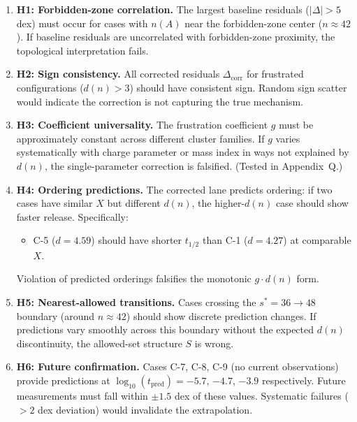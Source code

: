 \begin{edcopenbox}[title=Falsifiability Hooks]
\begin{enumerate}
    \item \textbf{H1: Forbidden-zone correlation.}
          The largest baseline residuals ($|\Delta| > 5$ dex) must occur
          for cases with $n(A)$ near the forbidden-zone center ($n \approx 42$).
          If baseline residuals are uncorrelated with forbidden-zone proximity,
          the topological interpretation fails.

    \item \textbf{H2: Sign consistency.}
          All corrected residuals $\Delta_{\text{corr}}$ for frustrated
          configurations ($d(n) > 3$) should have consistent sign. Random
          sign scatter would indicate the correction is not capturing the
          true mechanism.

    \item \textbf{H3: Coefficient universality.}
          The frustration coefficient $g$ must be approximately constant
          across different cluster families. If $g$ varies systematically
          with charge parameter or mass index in ways not explained by
          $d(n)$, the single-parameter correction is falsified.
          (Tested in Appendix~Q.)

    \item \textbf{H4: Ordering predictions.}
          The corrected lane predicts ordering: if two cases have similar
          $X$ but different $d(n)$, the higher-$d(n)$ case should show
          faster release. Specifically:
          \begin{itemize}
              \item C-5 ($d = 4.59$) should have shorter $t_{1/2}$ than
                    C-1 ($d = 4.27$) at comparable $X$.
          \end{itemize}
          Violation of predicted orderings falsifies the monotonic
          $g \cdot d(n)$ form.

    \item \textbf{H5: Nearest-allowed transitions.}
          Cases crossing the $s^* = 36 \to 48$ boundary (around $n \approx 42$)
          should show discrete prediction changes. If predictions vary
          smoothly across this boundary without the expected $d(n)$
          discontinuity, the allowed-set structure $S$ is wrong.

    \item \textbf{H6: Future confirmation.}
          Cases C-7, C-8, C-9 (no current observations) provide predictions
          at $\log_{10}(t_{\text{pred}}) = -5.7$, $-4.7$, $-3.9$ respectively.
          Future measurements must fall within $\pm 1.5$ dex of these values.
          Systematic failures ($> 2$ dex deviation) would invalidate the
          extrapolation.


\end{enumerate}
\end{edcopenbox}
